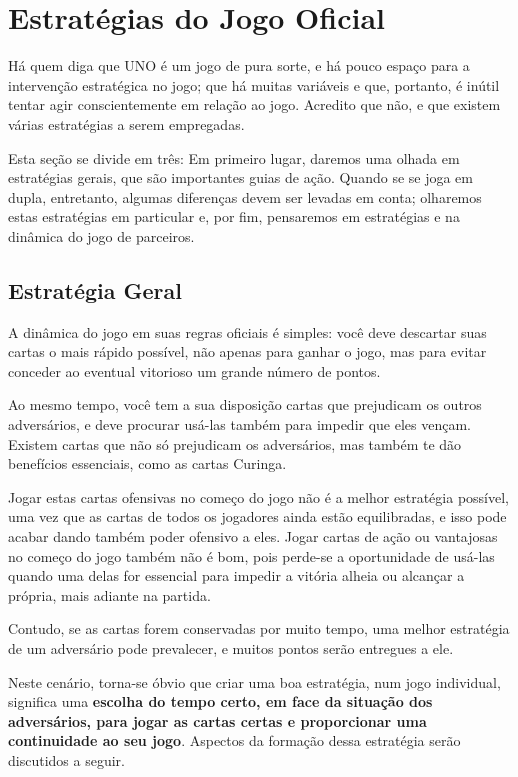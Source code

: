 \section{Estratégias do Jogo Oficial} 

Há quem diga que UNO é um jogo de pura sorte, e há pouco espaço para a intervenção estratégica no jogo; que há muitas variáveis e que, portanto, é inútil tentar agir conscientemente em relação ao jogo. Acredito que não, e que existem várias estratégias a serem empregadas.

Esta seção se divide em três: Em primeiro lugar, daremos uma olhada em estratégias gerais, que são importantes guias de ação. Quando se se joga em dupla, entretanto, algumas diferenças devem ser levadas em conta; olharemos estas estratégias em particular e, por fim, pensaremos em estratégias e na dinâmica do jogo de parceiros.

\subsection{Estratégia Geral}

A dinâmica do jogo em suas regras oficiais é simples: você deve descartar suas cartas o mais rápido possível, não apenas para ganhar o jogo, mas para evitar conceder ao eventual vitorioso um grande número de pontos.

Ao mesmo tempo, você tem a sua disposição cartas que prejudicam os outros adversários, e deve procurar usá-las também para impedir que eles vençam. Existem cartas que não só prejudicam os adversários, mas também te dão benefícios essenciais, como as cartas Curinga.

Jogar estas cartas ofensivas no começo do jogo não é a melhor estratégia possível, uma vez que as cartas de todos os jogadores ainda estão equilibradas, e isso pode acabar dando também poder ofensivo a eles. Jogar cartas de ação ou vantajosas no começo do jogo também não é bom, pois perde-se a oportunidade de usá-las quando uma delas for essencial para impedir a vitória alheia ou alcançar a própria, mais adiante na partida.

Contudo, se as cartas forem conservadas por muito tempo, uma melhor estratégia de um adversário pode prevalecer, e muitos pontos serão entregues a ele.

Neste cenário, torna-se óbvio que criar uma boa estratégia, num jogo individual, significa uma \textbf{escolha do tempo certo, em face da situação dos adversários, para jogar as cartas certas e proporcionar uma continuidade ao seu jogo}. Aspectos da formação dessa estratégia serão discutidos a seguir.


